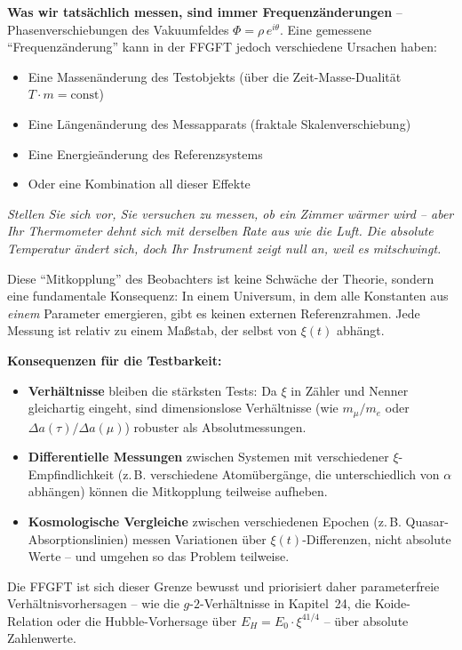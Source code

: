 	\textbf{Was wir tatsächlich messen, sind immer Frequenzänderungen} -- Phasenverschiebungen des Vakuumfeldes $\Phi = \rho\, e^{i\theta}$. Eine gemessene \enquote{Frequenzänderung} kann in der FFGFT jedoch verschiedene Ursachen haben:
	\begin{itemize}[leftmargin=*]
		\item Eine Massenänderung des Testobjekts (über die Zeit-Masse-Dualität $T \cdot m = \text{const}$)
		\item Eine Längenänderung des Messapparats (fraktale Skalenverschiebung)
		\item Eine Energieänderung des Referenzsystems
		\item Oder eine Kombination all dieser Effekte
	\end{itemize}
	
	\textit{Stellen Sie sich vor, Sie versuchen zu messen, ob ein Zimmer wärmer wird -- aber Ihr Thermometer dehnt sich mit derselben Rate aus wie die Luft. Die absolute Temperatur ändert sich, doch Ihr Instrument zeigt null an, weil es mitschwingt.}
	
	Diese \enquote{Mitkopplung} des Beobachters ist keine Schwäche der Theorie, sondern eine fundamentale Konsequenz: In einem Universum, in dem alle Konstanten aus \textit{einem} Parameter emergieren, gibt es keinen externen Referenzrahmen. Jede Messung ist relativ zu einem Maßstab, der selbst von $\xi(t)$ abhängt.
	
	\textbf{Konsequenzen für die Testbarkeit:}
	\begin{itemize}[leftmargin=*]
		\item \textbf{Verhältnisse} bleiben die stärksten Tests: Da $\xi$ in Zähler und Nenner gleichartig eingeht, sind dimensionslose Verhältnisse (wie $m_\mu/m_e$ oder $\Delta a(\tau)/\Delta a(\mu)$) robuster als Absolutmessungen.
		\item \textbf{Differentielle Messungen} zwischen Systemen mit verschiedener $\xi$-Empfindlichkeit (z.\,B. verschiedene Atomübergänge, die unterschiedlich von $\alpha$ abhängen) können die Mitkopplung teilweise aufheben.
		\item \textbf{Kosmologische Vergleiche} zwischen verschiedenen Epochen (z.\,B. Quasar-Absorptionslinien) messen Variationen über $\xi(t)$-Differenzen, nicht absolute Werte -- und umgehen so das Problem teilweise.
	\end{itemize}
	
	Die FFGFT ist sich dieser Grenze bewusst und priorisiert daher parameterfreie Verhältnisvorhersagen -- wie die $g$-$2$-Verhältnisse in Kapitel~24, die Koide-Relation oder die Hubble-Vorhersage über $E_H = E_0 \cdot \xi^{41/4}$ -- über absolute Zahlenwerte.

